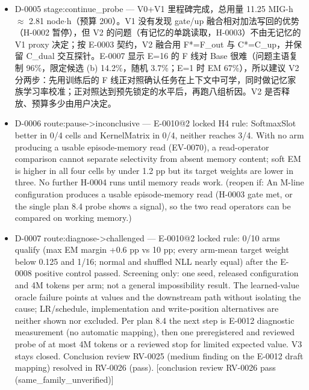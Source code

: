 \documentclass[11pt]{article}
\begin{document}
\begin{itemize}
\item D-0005 stage:continue\_probe --- V0+V1 里程碑完成，总用量 11.25 MIG-h \ensuremath{\approx} 2.81 node\ensuremath{\cdot}h（预算 200）。V1 没有发现 gate/up 融合相对加法写回的优势（H-0002 暂停），但 V2 的问题（有记忆的单跳读取，H-0003）不由无记忆的 V1 proxy 决定；按 E-0003 契约，V2 融合用 F*=F\_out 与 C*=C\_up，并保留 C\_dual 交互探针。E-0007 显示 E=16 的 F 线对 Base 很难（问题主语复制 96\%，限定候选 (b) 14.2\%，随机 3.7\%；E=1 时 EM 67\%），所以建议 V2 分两步：先用训练后的 F 线正对照确认任务在上下文中可学，同时做记忆家族学习率校准；正对照达到预先锁定的水平后，再跑八组析因。V2 是否释放、预算多少由用户决定。
\item D-0006 route:pause-\textgreater{}inconclusive --- E-0010@2 locked H4 rule: SoftmaxSlot better in 0/4 cells and KernelMatrix in 0/4, neither reaches 3/4. With no arm producing a usable episode-memory read (EV-0070), a read-operator comparison cannot separate selectivity from absent memory content; soft EM is higher in all four cells by under 1.2 pp but its target weights are lower in three. No further H-0004 runs until memory reads work. (reopen if: An M-line configuration produces a usable episode-memory read (H-0003 gate met, or the single plan 8.4 probe shows a signal), so the two read operators can be compared on working memory.)
\item D-0007 route:diagnose-\textgreater{}challenged --- E-0010@2 locked rule: 0/10 arms qualify (max EM margin +0.6 pp vs 10 pp; every arm-mean target weight below 0.125 and 1/16; normal and shuffled NLL nearly equal) after the E-0008 positive control passed. Screening only: one seed, released configuration and 4M tokens per arm; not a general impossibility result. The learned-value oracle failure points at values and the downstream path without isolating the cause; LR/schedule, implementation and write-position alternatives are neither shown nor excluded. Per plan 8.4 the next step is E-0012 diagnostic measurement (no automatic mapping), then one preregistered and reviewed probe of at most 4M tokens or a reviewed stop for limited expected value. V3 stays closed. Conclusion review RV-0025 (medium finding on the E-0012 draft mapping) resolved in RV-0026 (pass). [conclusion review RV-0026 pass (same\_family\_unverified)]

\end{itemize}
\end{document}
